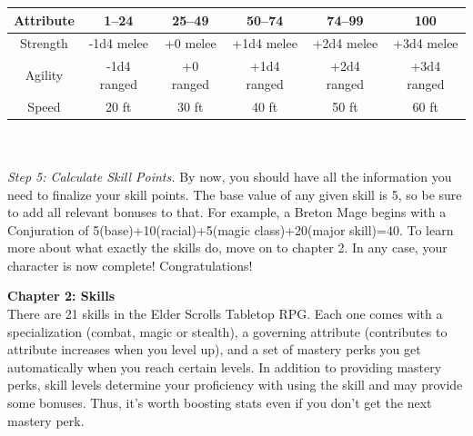 \documentclass[12pt]{article}
\begin{document}
\begin{tabular}{|c|c|c|c|c|c|}
\hline
Attribute & 1--24 & 25--49 & 50--74 & 74--99 & 100\\ \hline
Strength & -1d4 melee & +0 melee & +1d4 melee & +2d4 melee & +3d4 melee\\ \hline
Agility & -1d4 ranged & +0 ranged & +1d4 ranged & +2d4 ranged & +3d4 ranged\\ \hline
Speed & 20 ft & 30 ft & 40 ft & 50 ft & 60 ft\\ \hline

\end{tabular}\\~\\

\textit{Step 5: Calculate Skill Points.}
By now, you should have all the information you need to finalize your skill points. The base value of any given skill is 5, so be sure to add all relevant bonuses to that. For example, a Breton Mage begins with a Conjuration of 5(base)+10(racial)+5(magic class)+20(major skill)=40. To learn more about what exactly the skills do, move on to chapter 2. In any case, your character is now complete! Congratulations!

\newpage
\noindent
\textbf{Chapter 2: Skills}\\

There are 21 skills in the Elder Scrolls Tabletop RPG. Each one comes with a specialization (combat, magic or stealth), a governing attribute (contributes to attribute increases when you level up), and a set of mastery perks you get automatically when you reach certain levels. In addition to providing mastery perks, skill levels determine your proficiency with using the skill and may provide some bonuses. Thus, it's worth boosting stats even if you don't get the next mastery perk.
\end{document}

